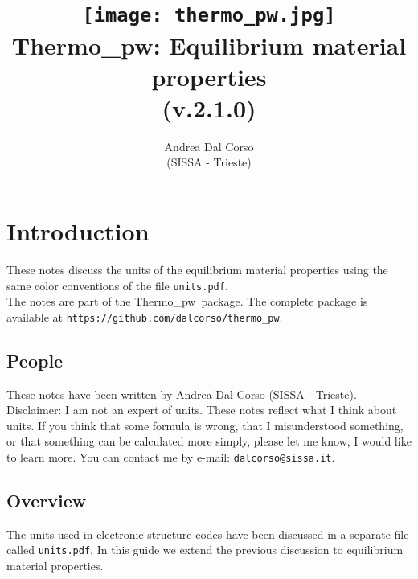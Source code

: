 \documentclass[12pt,a4paper,twoside]{report}
\def\version{2.1.0}
\def\tpw{{\sc Thermo\_pw}}
\begin{document}
 

\author{Andrea Dal Corso \\ (SISSA - Trieste)}
\date{}

\title{
  \texttt{[image: thermo\_pw.jpg]} \\
  \vspace{3truecm}
  \Huge \color{dark-blue} {\sc Thermo\_pw}: Equilibrium material properties \\ (v.\version)
}

\maketitle

\newpage

\tableofcontents

\newpage

{\color{dark-blue}\chapter{Introduction}}
\color{black}

These notes discuss the units of the equilibrium material properties
using the same color conventions of the file \texttt{units.pdf}.\\
The notes are part of the \tpw\ package. The complete package is
available at \texttt{https://github.com/dalcorso/thermo\_pw}.


\newpage
{\color{coral}\section{People}}
\color{black}

These notes have been written by Andrea Dal Corso (SISSA - Trieste). \\
Disclaimer: I am not an expert of units. 
These notes reflect what I think about units.
If you think that some formula is wrong, that I misunderstood something, or 
that something can be calculated more simply, please let me know, I would 
like to learn more. 
You can contact me by e-mail: \texttt{dalcorso@sissa.it}. 

\newpage
{\color{coral}\section{Overview}}
\color{black}
The units used in electronic structure codes have been
discussed in a separate file called \texttt{units.pdf}. In this guide
we extend the previous discussion to equilibrium material properties.
\end{document}
